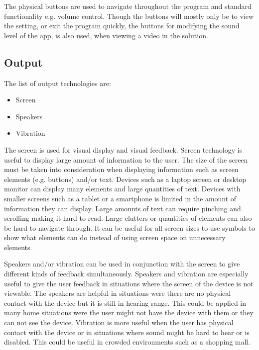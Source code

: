 
The physical buttons are used to navigate throughout the program and standard functionality e.g. volume control. Though the buttons will mostly only be to view the setting, or exit the program quickly, the buttons for modifying the sound level of the app, is also used, when viewing a video in the solution.

\subsection{Output}
The list of output technologies are:

\begin{itemize}
    \item Screen
    \item Speakers
    \item Vibration
\end{itemize}

The screen is used for visual display and visual feedback. Screen technology is useful to display large amount of information to the user.
The size of the screen must be taken into consideration when displaying information such as screen elements (e.g. buttons) and/or text.
Devices such as a laptop screen or desktop monitor can display many elements and large quantities of text.
Devices with smaller screens such as a tablet or a smartphone is limited in the amount of information they can display.
Large amounts of text can require pinching and scrolling making it hard to read. Large clutters or quantities of elements can also be hard to navigate through.
It can be useful for all screen sizes to use symbols to show what elements can do instead of using screen space on unnecessary elements.

Speakers and/or vibration can be used in conjunction with the screen to give different kinds of feedback simultaneously.
Speakers and vibration are especially useful to give the user feedback in situations where the screen of the device is not viewable.
The speakers are helpful in situations were there are no physical contact with the device but it is still in hearing range.
This could be applied in many home situations were the user might not have the device with them or they can not see the device.
Vibration is more useful when the user has physical contact with the device or in situations where sound might be hard to hear or is disabled.
This could be useful in crowded environments such as a shopping mall.     

